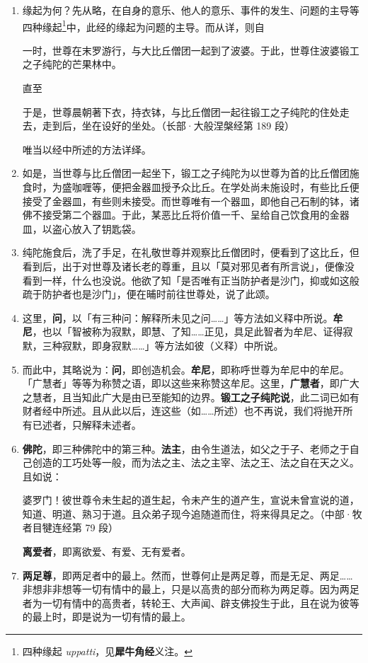 \begin{enumerate}\item 缘起为何？先从略，在自身的意乐、他人的意乐、事件的发生、问题的主导等四种缘起\footnote{四种缘起 \textit{uppatti}，见\textbf{犀牛角经}义注。}中，此经的缘起为问题的主导。而从详，则自\begin{quoting}一时，世尊在末罗游行，与大比丘僧团一起到了波婆。于此，世尊住波婆锻工之子纯陀的芒果林中。\end{quoting}直至\begin{quoting}于是，世尊晨朝著下衣，持衣钵，与比丘僧团一起往锻工之子纯陀的住处走去，走到后，坐在设好的坐处。（长部·大般涅槃经第 189 段）\end{quoting}唯当以经中所述的方法详绎。
\item 如是，当世尊与比丘僧团一起坐下，锻工之子纯陀为以世尊为首的比丘僧团施食时，为盛咖喱等，便把金器皿授予众比丘。在学处尚未施设时，有些比丘便接受了金器皿，有些则未接受。而世尊唯有一个器皿，即他自己石制的钵，诸佛不接受第二个器皿。于此，某恶比丘将价值一千、呈给自己饮食用的金器皿，以盗心放入了钥匙袋。
\item 纯陀施食后，洗了手足，在礼敬世尊并观察比丘僧团时，便看到了这比丘，但看到后，出于对世尊及诸长老的尊重，且以「莫对邪见者有所言说」，便像没看到一样，什么也没说。他欲了知「是否唯有正当防护者是沙门，抑或如这般疏于防护者也是沙门」，便在晡时前往世尊处，说了此颂。
\item 这里，\textbf{问}，以「有三种问：解释所未见之问……」等方法如义释中所说。\textbf{牟尼}，也以「智被称为寂默，即慧、了知……正见，具足此智者为牟尼、证得寂默，三种寂默，即身寂默……」等方法如彼（义释）中所说。
\item 而此中，其略说为：\textbf{问}，即创造机会。\textbf{牟尼}，即称呼世尊为牟尼中的牟尼。「广慧者」等等为称赞之语，即以这些来称赞这牟尼。这里，\textbf{广慧者}，即广大之慧者，且当知此广大是由已至能知的边界。\textbf{锻工之子纯陀说}，此二词已如有财者经中所述。且从此以后，连这些（如……所述）也不再说，我们将抛开所有已述者，只解释未述者。
\item \textbf{佛陀}，即三种佛陀中的第三种。\textbf{法主}，由令生道法，如父之于子、老师之于自己创造的工巧处等一般，而为法之主、法之主宰、法之王、法之自在天之义。且如说：\begin{quoting}婆罗门！彼世尊令未生起的道生起，令未产生的道产生，宣说未曾宣说的道，知道、明道、熟习于道。且众弟子现今追随道而住，将来得具足之。（中部·牧者目犍连经第 79 段）\end{quoting}\textbf{离爱者}，即离欲爱、有爱、无有爱者。
\item \textbf{两足尊}，即两足者中的最上。然而，世尊何止是两足尊，而是无足、两足……非想非非想等一切有情中的最上，只是以高贵的部分而称为两足尊。因为两足者为一切有情中的高贵者，转轮王、大声闻、辟支佛投生于此，且在说为彼等的最上时，即是说为一切有情的最上。

\end{enumerate}

